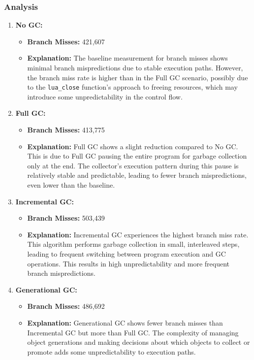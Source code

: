 \documentclass[10pt]{article}
\begin{document}
\subsubsection{Analysis}
\begin{enumerate}
  \item \textbf{No GC:} 
  \begin{itemize}
    \item \textbf{Branch Misses:} 421,607
    \item \textbf{Explanation:} The baseline measurement for branch misses shows minimal branch mispredictions due to stable execution paths. However, the branch miss rate is higher than in the Full GC scenario, possibly due to the \texttt{lua\_close} function's approach to freeing resources, which may introduce some unpredictability in the control flow.
  \end{itemize}

  \item \textbf{Full GC:} 
  \begin{itemize}
    \item \textbf{Branch Misses:} 413,775
    \item \textbf{Explanation:} Full GC shows a slight reduction compared to No GC. This is due to Full GC pausing the entire program for garbage collection only at the end. The collector's execution pattern during this pause is relatively stable and predictable, leading to fewer branch mispredictions, even lower than the baseline.
  \end{itemize}

  \item \textbf{Incremental GC:} 
  \begin{itemize}
    \item \textbf{Branch Misses:} 503,439
    \item \textbf{Explanation:} Incremental GC experiences the highest branch miss rate. This algorithm performs garbage collection in small, interleaved steps, leading to frequent switching between program execution and GC operations. This results in high unpredictability and more frequent branch mispredictions.
  \end{itemize}

  \item \textbf{Generational GC:} 
  \begin{itemize}
    \item \textbf{Branch Misses:} 486,692
    \item \textbf{Explanation:} Generational GC shows fewer branch misses than Incremental GC but more than Full GC. The complexity of managing object generations and making decisions about which objects to collect or promote adds some unpredictability to execution paths.
  \end{itemize}
\end{enumerate}
\end{document}
